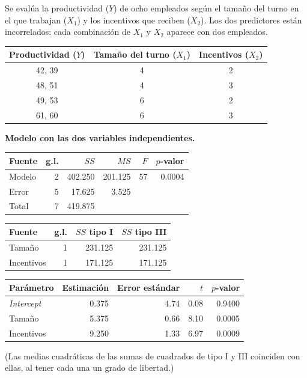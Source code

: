 \begin{ejemplo}
  Se evalúa la productividad ($Y$) de ocho empleados según el tamaño del turno en el que trabajan
  ($X_1$) y los incentivos que reciben ($X_2$). Los dos predictores están incorrelados: cada
  combinación de $X_1$ y $X_2$ aparece con dos empleados.
  \begin{center}
    \renewcommand{\arraystretch}{1.15}
    \begin{tabular}{ccc}
      \toprule
      Productividad ($Y$) & Tamaño del turno ($X_1$) & Incentivos ($X_2$) \\
      \midrule
      42, 39 & 4 & 2 \\
      48, 51 & 4 & 3 \\
      49, 53 & 6 & 2 \\
      61, 60 & 6 & 3 \\
      \bottomrule
    \end{tabular}
  \end{center}

  \textbf{Modelo con las dos variables independientes.}
  \begin{center}
    \small
    \renewcommand{\arraystretch}{1.15}
    \begin{tabular}{lrrrrr}
      \toprule
      Fuente & g.l. & $SS$ & $MS$ & $F$ & $p$-valor \\
      \midrule
      Modelo & 2 & 402.250 & 201.125 & 57 & 0.0004 \\
      Error & 5 & 17.625 & 3.525 & & \\
      Total & 7 & 419.875 & & & \\
      \bottomrule
    \end{tabular}
    \qquad
    \begin{tabular}{lrrr}
      \toprule
      Fuente & g.l. & $SS$ tipo I & $SS$ tipo III \\
      \midrule
      Tamaño & 1 & 231.125 & 231.125 \\
      Incentivos & 1 & 171.125 & 171.125 \\
      \bottomrule
    \end{tabular}

    \medskip
    \begin{tabular}{lrrrr}
      \toprule
      Parámetro & Estimación & Error estándar & $t$ & $p$-valor \\
      \midrule
      \emph{Intercept} & 0.375 & 4.74 & 0.08 & 0.9400 \\
      Tamaño & 5.375 & 0.66 & 8.10 & 0.0005 \\
      Incentivos & 9.250 & 1.33 & 6.97 & 0.0009 \\
      \bottomrule
    \end{tabular}
  \end{center}
  (Las medias cuadráticas de las sumas de cuadrados de tipo I y III coinciden con ellas, al tener
  cada una un grado de libertad.)


\end{ejemplo}
